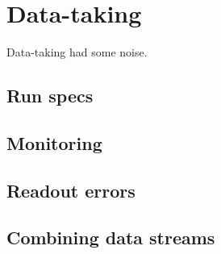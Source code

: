 \section{Data-taking}
\label{sec:data-taking}

Data-taking had some noise.

\subsection{Run specs}
\label{sec:data-run}

\subsection{Monitoring}
\label{sec:data-mon}

\subsection{Readout errors}
\label{sec:data-errors}

\subsection{Combining data streams}
\label{sec:data-streams}


